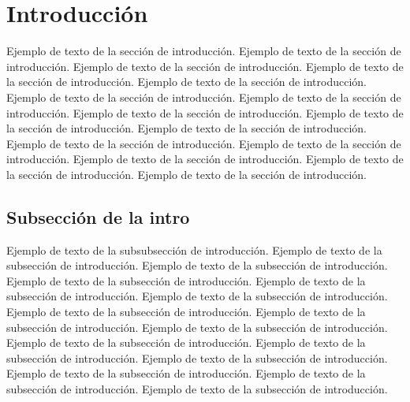 \section{Introducción}

Ejemplo de texto de la sección de introducción. Ejemplo de texto de la sección de introducción. Ejemplo de texto de la sección de introducción. Ejemplo de texto de la sección de introducción. Ejemplo de texto de la sección de introducción. Ejemplo de texto de la sección de introducción. Ejemplo de texto de la sección de introducción. Ejemplo de texto de la sección de introducción. Ejemplo de texto de la sección de introducción. Ejemplo de texto de la sección de introducción. Ejemplo de texto de la sección de introducción. Ejemplo de texto de la sección de introducción. Ejemplo de texto de la sección de introducción. Ejemplo de texto de la sección de introducción. Ejemplo de texto de la sección de introducción. 

\subsection{Subsección de la intro}

Ejemplo de texto de la subsubsección de introducción. Ejemplo de texto de la subsección de introducción. Ejemplo de texto de la subsección de introducción. Ejemplo de texto de la subsección de introducción. Ejemplo de texto de la subsección de introducción. Ejemplo de texto de la subsección de introducción. Ejemplo de texto de la subsección de introducción. Ejemplo de texto de la subsección de introducción. Ejemplo de texto de la subsección de introducción. Ejemplo de texto de la subsección de introducción. Ejemplo de texto de la subsección de introducción. Ejemplo de texto de la subsección de introducción. Ejemplo de texto de la subsección de introducción. Ejemplo de texto de la subsección de introducción. Ejemplo de texto de la subsección de introducción. 